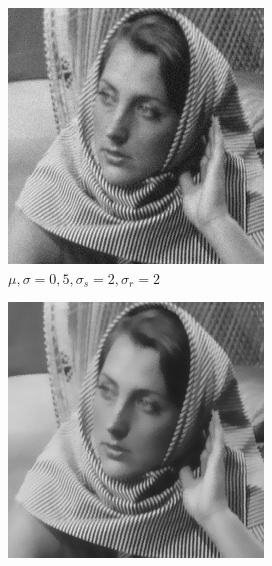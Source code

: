 \documentclass[a4paper, landscape]{article}
\begin{document}
\begin{figure}
\begin{subfigure}{0.33\linewidth}
        \includegraphics[width=\linewidth]{barbara256,σ_noise5,σ_spatial2,σ_range2.png}
        \caption{$\mu, \sigma = 0, 5, \sigma_s=2, \sigma_r=2$}
    \end{subfigure}
    \begin{subfigure}{0.33\linewidth}
        \centering
        \includegraphics[width=\linewidth]{barbara256,σ_noise5,σ_spatial3,σ_range15.png}

\end{subfigure}
\end{figure}
\end{document}

